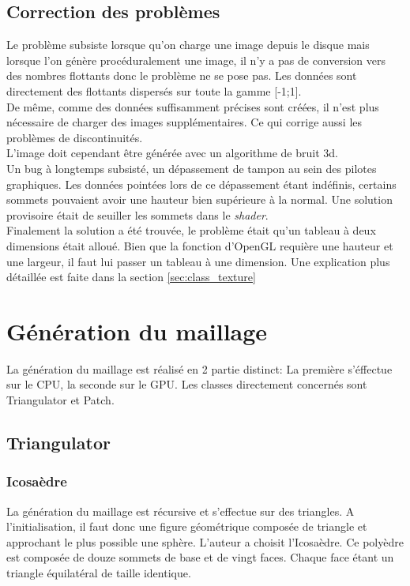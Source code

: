     \subsection{Correction des problèmes}
    Le problème subsiste lorsque qu'on charge une image depuis le disque mais lorsque l'on génère procéduralement une image,
    il n'y a pas de conversion vers des nombres flottants donc le problème ne se pose pas. Les données sont directement des flottants dispersés sur toute la gamme [-1;1].\\
    De même, comme des données suffisamment précises sont créées, il n'est plus nécessaire de charger des images supplémentaires. Ce qui corrige aussi les problèmes de discontinuités.\\
    L'image doit cependant être générée avec un algorithme de bruit 3d.\\
    
    Un bug à longtemps subsisté, un dépassement de tampon au sein des pilotes graphiques. 
    Les données pointées lors de ce dépassement étant indéfinis, certains sommets pouvaient avoir une hauteur bien supérieure à la normal. Une solution provisoire était de seuiller les sommets dans le \textit{shader}.\\
    Finalement la solution a été trouvée, le problème était qu'un tableau à deux dimensions était alloué.
    Bien que la fonction d'OpenGL requière une hauteur et une largeur, il faut lui passer un tableau à une dimension. Une explication plus détaillée est faite dans la section \ref{sec:class_texture}
    
   \section{Génération du maillage}	%
   La génération du maillage est réalisé en 2 partie distinct: La première s'éffectue sur le CPU, la seconde sur le GPU. Les classes directement concernés sont Triangulator et Patch.
  \subsection{Triangulator}
	\subsubsection{Icosaèdre}
	\label{subsec:icosaèdre}
	
	La génération du maillage est récursive et s'effectue sur des triangles. A l'initialisation, il faut donc une figure géométrique composée de triangle et approchant le plus possible une sphère. L'auteur a choisit l'Icosaèdre. Ce polyèdre est composée de douze sommets de base et de vingt faces. Chaque face étant un triangle équilatéral de taille identique.
	
